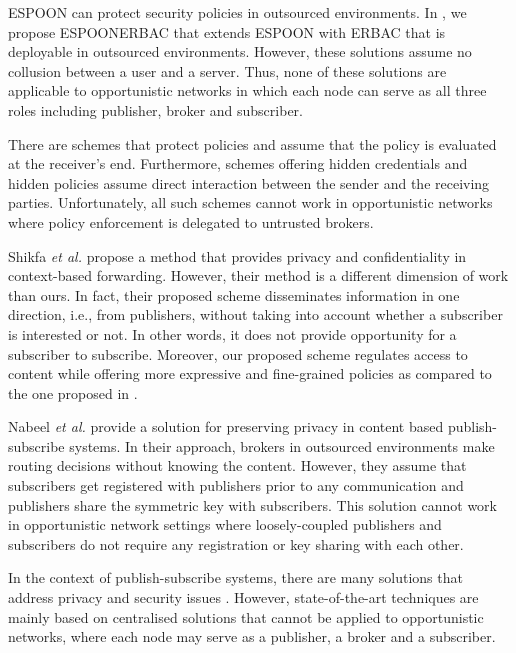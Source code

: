 \documentclass[epsfig,a4paper,11pt,titlepage]{book}
\numberwithin{algorithm}{chapter}
\begin{document}
\gls{ESPOON} \cite{Asghar2011-ARES} can protect security policies in outsourced environments. In \cite{Asghar2013-COSE}, we propose \gls{ESPOONERBAC} that extends \gls{ESPOON} with \gls{ERBAC} that is deployable in outsourced environments. However, these solutions \cite{Asghar2013-COSE, Asghar2011-ARES, Kapadia:2007} assume no collusion between a user and a server. Thus, none of these solutions \cite{Asghar2013-COSE, Asghar2011-ARES, Kapadia:2007} are applicable to opportunistic networks in which each node can serve as all three roles including publisher, broker and subscriber.

There are schemes that protect policies \cite{Shen:2009, Katz:2013, Nishide:2008, Lai:2011} and assume that the policy is evaluated at the receiver's end. Furthermore, schemes offering hidden credentials \cite{Holt:2003} and hidden policies \cite{Frikken:2006} assume direct interaction between the sender and the receiving parties. Unfortunately, all such schemes cannot work in opportunistic networks where policy enforcement is delegated to untrusted brokers.

Shikfa \emph{et al.} \cite{Shikfa:2010} propose a method that provides privacy and confidentiality in context-based forwarding. However, their method is a different dimension of work than ours. In fact, their proposed scheme disseminates information in one direction, i.e., from publishers, without taking into account whether a subscriber is interested or not. In other words, it does not provide opportunity for a subscriber to subscribe. Moreover, our proposed scheme regulates access to content while offering more expressive and fine-grained policies as compared to the one proposed in \cite{Shikfa:2010}.






Nabeel \emph{et al.} \cite{Nabeel:2012} provide a solution for preserving privacy in content based publish-subscribe systems. In their approach, brokers in outsourced environments make routing decisions without knowing the content. However, they assume that subscribers get registered with publishers prior to any communication and publishers share the symmetric key with subscribers. This solution cannot work in opportunistic network settings where loosely-coupled publishers and subscribers do not require any registration or key sharing with each other. 

In the context of publish-subscribe systems, there are many solutions that address privacy and security issues \cite{Choi:2010, Shang:2010, Srivatsa:2007}. However, state-of-the-art techniques are mainly based on centralised solutions that cannot be applied to opportunistic networks, where each node may serve as a publisher, a broker and a subscriber.
\end{document}
